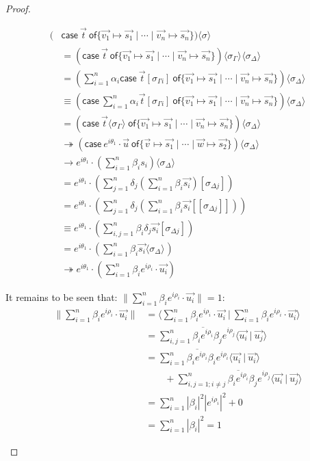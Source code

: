 \documentclass[runningheads,orivec]{llncs}
\newcommand\ansubst[2]{\ensuremath{\langle #1 \rangle_{#2}}}
\def\scal#1#2{\langle{#1}~|~{#2}\rangle}
\def\gencase#1#2#3#4#5{\ensuremath{\mathsf{case}~#1~\mathsf{of} \{#2\mapsto #4 \mid \dotsb \mid #3\mapsto #5\}}}
\def\evalone{\rightarrow}
\def\eval{\twoheadrightarrow}
\begin{document}
\begin{proof}
\begin{description}
    \begin{align*}
        (&\gencase{\vec{t}}{\vec{v_1}}{\vec{v_n}}{\vec{s_1}}{\vec{s_n}})\ansubst{\sigma}{}\\ 
        &= (\gencase{\vec{t}}{\vec{v_1}}{\vec{v_n}}{\vec{s_1}}{\vec{s_n}})\ansubst{\sigma_\Gamma}{}\ansubst{\sigma_\Delta}{}\\
        &=(\sum_{i=1}^{n}\alpha_i \gencase{\vec{t}[\sigma_{\Gamma i}]}{\vec{v_1}}{\vec{v_n}}{\vec{s_1}}{\vec{s_n}})\ansubst{\sigma_\Delta}{} \\
        &\equiv (\gencase{\sum_{i=1}^{n} \alpha_i \vec{t}[\sigma_{\Gamma i}]}{\vec {v_1}}{\vec{v_n}}{\vec{s_1}}{\vec{s_n}})\ansubst{\sigma_\Delta}{}\\
        &=(\gencase{\vec{t}\ansubst{\sigma_\Gamma}{}}{\vec{v_1}}{\vec{v_n}}{\vec{s_1}}{\vec{s_n}})\ansubst{\sigma_\Delta}{}\\
        &\eval(\gencase{e^{i\theta_1}\cdot\vec{u}}{\vec{v}}{\vec{w}}{\vec{s_1}}{\vec{s_2}})\ansubst{\sigma_\Delta}{}\\
        &\evalone e^{i\theta_1}\cdot(\sum_{i=1}^{n}\beta_i s_i)\ansubst{\sigma_\Delta}{}\\
        &= e^{i\theta_1}\cdot(\sum_{j=1}^{n}\delta_j (\sum_{i=1}^{n}\beta_i \vec{s_i})[\sigma_{\Delta j}])\\
        &= e^{i\theta_1}\cdot(\sum_{j=1}^{n}\delta_j (\sum_{i=1}^{n}\beta_i \vec{s_i}[[\sigma_{\Delta j}]]))\\
        &\equiv e^{i\theta_1}\cdot(\sum_{i,j=1}^{n}\beta_i\delta_j\vec{s_i}[\sigma_{\Delta j}])\\
        &= e^{i\theta_1}\cdot(\sum_{i=1}^{n}\beta_i \vec{s_i}\ansubst{\sigma_\Delta}{})\\
        &\eval e^{i\theta_1}\cdot(\sum_{i=1}^{n}\beta_i e^{i\rho_i}\cdot\vec{u_i})
    \end{align*}
    
    It remains to be seen that: $\|\sum_{i=1}^{n}\beta_i e^{i\rho_i}\cdot\vec{u_i}\|=1$:
    \begin{align*}
        \|\sum_{i=1}^{n}\beta_i e^{i\rho_i}\cdot\vec{u_i}\| &= \scal{\sum_{i=1}^{n}\beta_i e^{i\rho_i}\cdot\vec{u_i}}{\sum_{i=1}^{n}\beta_i e^{i\rho_i}\cdot\vec{u_i}}\\
        &= \sum_{i,j=1}^{n}\overline{\beta_i e^{i\rho_i}}\beta_j e^{i\rho_j} \scal{\vec{u_i}}{\vec{u_j}}\\
        &= \sum_{i=1}^{n}\overline{\beta_i e^{i\rho_i}}\beta_i e^{i\rho_i} \scal{\vec{u_i}}{\vec{u_i}}\\
        &\qquad + \sum_{i,j=1; i\neq j}^{n}\overline{\beta_i e^{i\rho_i}}\beta_j e^{i\rho_j} \scal{\vec{u_i}}{\vec{u_j}}\\
        &= \sum_{i=1}^{n}|\beta_i|^2 |e^{i\rho_i}|^2  + 0\\
        &= \sum_{i=1}^{n}|\beta_i|^2 = 1
    \end{align*}


\end{description}
\end{proof}
\end{document}
